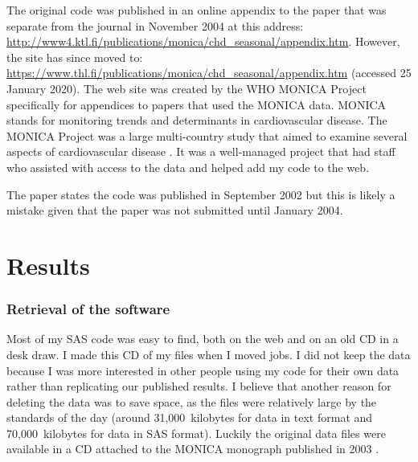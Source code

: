 The original code was published in an online appendix to the paper that was separate from the journal in November 2004 at this address: \url{http://www4.ktl.fi/publications/monica/chd_seasonal/appendix.htm}. However, the site has since moved to: \url{https://www.thl.fi/publications/monica/chd_seasonal/appendix.htm} (accessed 25 January 2020). The web site was created by the WHO MONICA Project specifically for appendices to papers that used the MONICA data. MONICA stands for monitoring trends and determinants in cardiovascular disease. The MONICA Project was a large multi-country study that aimed to examine several aspects of cardiovascular disease \supercite{Tunstall2003}. It was a well-managed project that had staff who assisted with access to the data and helped add my code to the web.  

The paper states the code was published in September 2002 but this is likely a mistake given that the paper was not submitted until January 2004. 


\section{Results}


\subsubsection{Retrieval of the software}

Most of my SAS code was easy to find, both on the web and on an old CD in a desk draw. I made this CD of my files when I moved jobs. I did not keep the data because I was more interested in other people using my code for their own data rather than replicating our published results. I believe that another reason for deleting the data was to save space, as the files were relatively large by the standards of the day (around 31,000~kilobytes for data in text format and 70,000~kilobytes for data in SAS format). Luckily the original data files were available in a CD attached to the MONICA monograph published in 2003 \supercite{Tunstall2003}.

